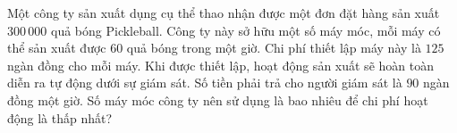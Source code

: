\begin{bt}%
	Một công ty sản xuất dụng cụ thể thao nhận được một đơn đặt hàng sản xuất $300\,000$ quả bóng Pickleball. Công ty này sở hữu một số máy móc, mỗi máy có thể sản xuất được $60$ quả bóng trong một giờ. Chi phí thiết lập máy này là $125$ ngàn đồng cho mỗi máy. Khi được thiết lập, hoạt động sản xuất sẽ hoàn toàn diễn ra tự động dưới sự giám sát. Số tiền phải trả cho người giám sát là $90$ ngàn đồng một giờ. Số máy móc công ty nên sử dụng là bao nhiêu để chi phí hoạt động  là thấp nhất?
\end{bt}

